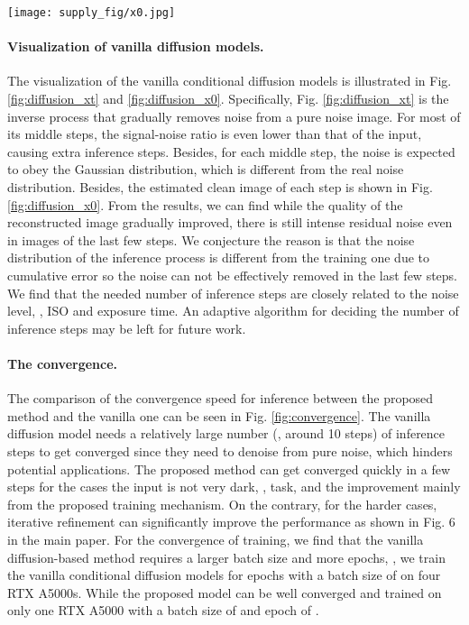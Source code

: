 \documentclass[10pt,twocolumn,letterpaper]{article}
\begin{document}
\begin{figure*}[t]
    \centering
    \texttt{[image: supply\_fig/x0.jpg]}
    \caption{The diffusion process of the vanilla conditional diffusion model~\cite{saharia2022image} combined with the sampling strategy from DDIM \cite{song2020denoising}. The image restoration process starts with pure noise and gradually removes noise in it.}
    \label{fig:diffusion_xt}
\end{figure*}


\paragraph{Visualization of vanilla diffusion models.} The visualization of the vanilla conditional diffusion models is illustrated in Fig. \ref{fig:diffusion_xt} and \ref{fig:diffusion_x0}. Specifically, Fig. \ref{fig:diffusion_xt} is the inverse process that gradually removes noise from a pure noise image. For most of its middle steps, the signal-noise ratio is even lower than that of the input, causing extra inference steps. Besides, for each middle step, the noise is expected to obey the Gaussian distribution, which is different from the real noise distribution. Besides, the estimated clean image of each step is shown in Fig. \ref{fig:diffusion_x0}. From the results, we can find while the quality of the reconstructed image gradually improved, there is still intense residual noise even in images of the last few steps. We conjecture the reason is that the noise distribution of the inference process is different from the training one due to cumulative error so the noise can not be effectively removed in the last few steps. We find that the needed number of inference steps are closely related to the noise level, \eg, ISO and exposure time. An adaptive algorithm for deciding the number of inference steps may be left for future work.




\paragraph{The convergence.} 
The comparison of the convergence speed for inference between the proposed method and the vanilla one can be seen in Fig. \ref{fig:convergence}. The vanilla diffusion model needs a relatively large number (\eg, around 10 steps) of inference steps to get converged since they need to denoise from pure noise, which hinders potential applications. 
The proposed method can get converged quickly in a few steps for the cases the input is not very dark, \eg,  task, and the improvement mainly from the proposed training mechanism. On the contrary, for the harder cases, iterative refinement can significantly improve the performance as shown in Fig. 6 in the main paper. For the convergence of training, we find that the vanilla diffusion-based method requires a larger batch size and more epochs, \eg, we train the vanilla conditional diffusion models for  epochs with a batch size of  on four RTX A5000s. While the proposed model can be well converged and trained on only one RTX A5000 with a batch size of  and epoch of .
 
\end{document}
